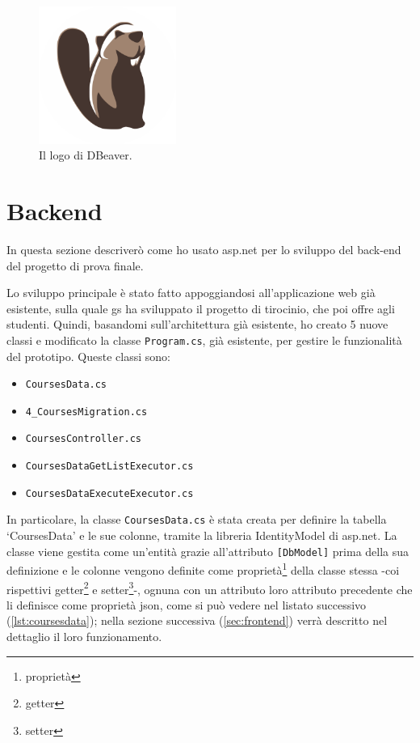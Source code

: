 \begin{figure}[H]
\centering
\includegraphics[width=0.4\textwidth]{Images/dbeaver.png}
\caption{\label{fig:dbeaver}Il logo di DBeaver.}
\end{figure}


\newpage
\section{Backend}\label{sec:backend}
In questa sezione descriverò come ho usato \acrshort{asp.net} per lo sviluppo del back-end del progetto di prova finale.\newline

Lo sviluppo principale è stato fatto appoggiandosi all'applicazione web già esistente, sulla quale \acrfull{gs} ha sviluppato il progetto di tirocinio, che poi offre agli studenti. Quindi, basandomi sull'architettura già esistente, ho creato 5 nuove classi e modificato la classe \texttt{Program.cs}, già esistente, per gestire le funzionalità del prototipo. Queste classi sono:
\begin{itemize}
  \item \texttt{CoursesData.cs}
  \item \texttt{4\_CoursesMigration.cs}
  \item \texttt{CoursesController.cs}
  \item \texttt{CoursesDataGetListExecutor.cs}
  \item \texttt{CoursesDataExecuteExecutor.cs}
\end{itemize}

In particolare, la classe \texttt{CoursesData.cs} è stata creata per definire la tabella `CoursesData' e le sue colonne, tramite la libreria IdentityModel di \acrshort{asp.net}. La classe viene gestita come un'entità grazie all'attributo \texttt{[DbModel]} prima della sua definizione e le colonne vengono definite come proprietà\footnote{\glsdesc{proprietà}} della classe stessa -coi rispettivi getter\footnote{\glsdesc{getter}} e setter\footnote{\glsdesc{setter}}-, ognuna con un attributo loro attributo precedente che li definisce come proprietà \acrshort{json}, come si può vedere nel listato successivo (\ref{lst:coursesdata}); nella sezione successiva (\ref{sec:frontend}) verrà descritto nel dettaglio il loro funzionamento.\newline

